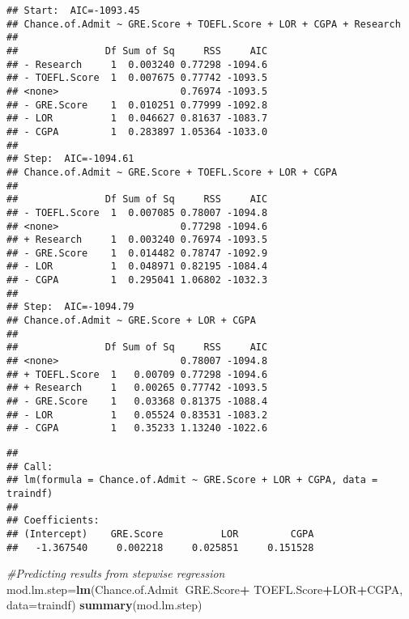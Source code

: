 \documentclass[11pt,]{article}
\newenvironment{Shaded}{\begin{snugshade}}{\end{snugshade}}
\newcommand{\CommentTok}[1]{\textcolor[rgb]{0.56,0.35,0.01}{\textit{#1}}}
\newcommand{\DataTypeTok}[1]{\textcolor[rgb]{0.13,0.29,0.53}{#1}}
\newcommand{\KeywordTok}[1]{\textcolor[rgb]{0.13,0.29,0.53}{\textbf{#1}}}
\newcommand{\NormalTok}[1]{#1}
\newcommand{\OperatorTok}[1]{\textcolor[rgb]{0.81,0.36,0.00}{\textbf{#1}}}
\newcommand{\StringTok}[1]{\textcolor[rgb]{0.31,0.60,0.02}{#1}}
\begin{document}
\begin{verbatim}
## Start:  AIC=-1093.45
## Chance.of.Admit ~ GRE.Score + TOEFL.Score + LOR + CGPA + Research
## 
##               Df Sum of Sq     RSS     AIC
## - Research     1  0.003240 0.77298 -1094.6
## - TOEFL.Score  1  0.007675 0.77742 -1093.5
## <none>                     0.76974 -1093.5
## - GRE.Score    1  0.010251 0.77999 -1092.8
## - LOR          1  0.046627 0.81637 -1083.7
## - CGPA         1  0.283897 1.05364 -1033.0
## 
## Step:  AIC=-1094.61
## Chance.of.Admit ~ GRE.Score + TOEFL.Score + LOR + CGPA
## 
##               Df Sum of Sq     RSS     AIC
## - TOEFL.Score  1  0.007085 0.78007 -1094.8
## <none>                     0.77298 -1094.6
## + Research     1  0.003240 0.76974 -1093.5
## - GRE.Score    1  0.014482 0.78747 -1092.9
## - LOR          1  0.048971 0.82195 -1084.4
## - CGPA         1  0.295041 1.06802 -1032.3
## 
## Step:  AIC=-1094.79
## Chance.of.Admit ~ GRE.Score + LOR + CGPA
## 
##               Df Sum of Sq     RSS     AIC
## <none>                     0.78007 -1094.8
## + TOEFL.Score  1   0.00709 0.77298 -1094.6
## + Research     1   0.00265 0.77742 -1093.5
## - GRE.Score    1   0.03368 0.81375 -1088.4
## - LOR          1   0.05524 0.83531 -1083.2
## - CGPA         1   0.35233 1.13240 -1022.6
\end{verbatim}

\begin{verbatim}
## 
## Call:
## lm(formula = Chance.of.Admit ~ GRE.Score + LOR + CGPA, data = traindf)
## 
## Coefficients:
## (Intercept)    GRE.Score          LOR         CGPA  
##   -1.367540     0.002218     0.025851     0.151528
\end{verbatim}

\begin{Shaded}
\begin{Highlighting}[]
\CommentTok{#Predicting results from stepwise regression}
\NormalTok{mod.lm.step=}\KeywordTok{lm}\NormalTok{(Chance.of.Admit}\OperatorTok{~}\NormalTok{GRE.Score}\OperatorTok{+}
\StringTok{                 }\NormalTok{TOEFL.Score}\OperatorTok{+}\NormalTok{LOR}\OperatorTok{+}\NormalTok{CGPA, }\DataTypeTok{data=}\NormalTok{traindf)}
\KeywordTok{summary}\NormalTok{(mod.lm.step)}
\end{Highlighting}
\end{Shaded}
\end{document}
